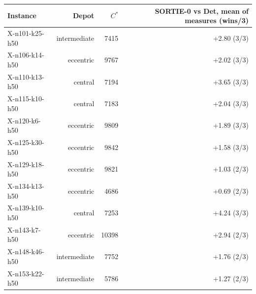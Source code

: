 \begin{tabular}{lrrr}
\toprule
Instance & Depot & $C^\ast$ & SORTIE-0 vs Det, mean of measures (wins/3) \\
\midrule
X-n101-k25-h50 & intermediate & 7415 & +2.80 (3/3) \\
X-n106-k14-h50 & eccentric & 9767 & +2.02 (3/3) \\
X-n110-k13-h50 & central & 7194 & +3.65 (3/3) \\
X-n115-k10-h50 & central & 7183 & +2.04 (3/3) \\
X-n120-k6-h50 & eccentric & 9809 & +1.89 (3/3) \\
X-n125-k30-h50 & eccentric & 9842 & +1.58 (3/3) \\
X-n129-k18-h50 & eccentric & 9821 & +1.03 (2/3) \\
X-n134-k13-h50 & eccentric & 4686 & +0.69 (2/3) \\
X-n139-k10-h50 & central & 7253 & +4.24 (3/3) \\
X-n143-k7-h50 & eccentric & 10398 & +2.94 (2/3) \\
X-n148-k46-h50 & intermediate & 7752 & +1.76 (2/3) \\
X-n153-k22-h50 & intermediate & 5786 & +1.27 (2/3) \\
\bottomrule
\end{tabular}

